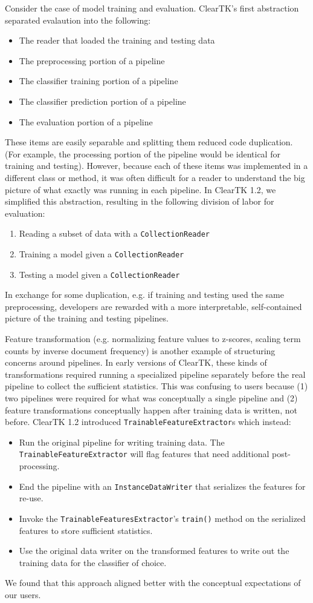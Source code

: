 \documentclass[10pt, a4paper]{article}
\newcommand{\code}[1]{\texttt{\small #1}}
\begin{document}
Consider the case of model training and evaluation.
ClearTK's first abstraction separated evalaution into the following:
\begin{itemize}
\item The reader that loaded the training and testing data
\item The preprocessing portion of a pipeline
\item The classifier training portion of a pipeline
\item The classifier prediction portion of a pipeline
\item The evaluation portion of a pipeline
\end{itemize}
These items are easily separable and splitting them reduced code duplication. (For example, the processing portion of the pipeline would be identical for training and testing).
However, because each of these items was implemented in a different class or method, it was often difficult for a reader to understand the big picture of what exactly was running in each pipeline.
In ClearTK 1.2, we simplified this abstraction, resulting in the following division of labor for evaluation:
\begin{enumerate}
\item Reading a subset of data with a \code{CollectionReader}
\item Training a model given a \code{CollectionReader}
\item Testing a model given a \code{CollectionReader}
\end{enumerate}
In exchange for some duplication, e.g. if training and testing used the same preprocessing, developers are rewarded with a more interpretable, self-contained picture of the training and testing pipelines.

Feature transformation (e.g. normalizing feature values to z-scores, scaling term counts by inverse document frequency) is another example of structuring concerns around pipelines.
In early versions of ClearTK, these kinds of transformations required running a specialized pipeline separately before the real pipeline to collect the sufficient statistics.
This was confusing to users because (1) two pipelines were required for what was conceptually a single pipeline and (2) feature transformations conceptually happen after training data is written, not before.
ClearTK 1.2 introduced \code{TrainableFeatureExtractor}s which instead:
\begin{itemize}
\item Run the original pipeline for writing training data. The \code{TrainableFeatureExtractor} will flag features that need additional post-processing.
\item End the pipeline with an \code{InstanceDataWriter} that serializes the features for re-use.
\item Invoke the \code{TrainableFeaturesExtractor}'s \code{train()} method on the serialized features to store sufficient statistics.
\item Use the original data writer on the transformed features to write out the training data for the classifier of choice.
\end{itemize}
We found that this approach aligned better with the conceptual expectations of our users.
\end{document}
